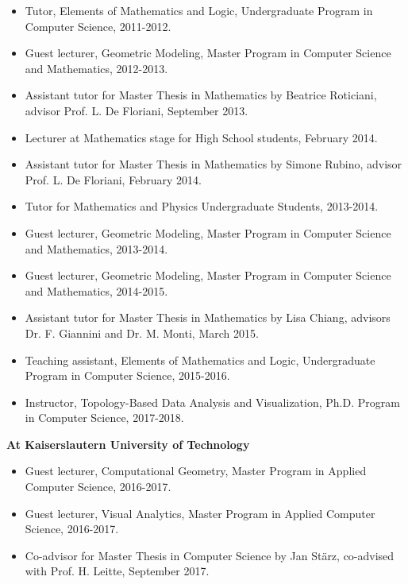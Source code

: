 \documentclass[11pt]{article}
\begin{document}
\begin{itemize}
\item Tutor, Elements of Mathematics and Logic, Undergraduate Program in Computer Science, 2011-2012.
\item Guest lecturer, Geometric Modeling, Master Program in Computer Science and Mathematics, 2012-2013.
\item Assistant tutor for Master Thesis in Mathematics by Beatrice Roticiani, advisor Prof. L. De Floriani, September 2013.
\item Lecturer at Mathematics stage for High School students, February 2014.
\item Assistant tutor for Master Thesis in Mathematics by Simone Rubino, advisor Prof. L. De Floriani, February 2014.
\item Tutor for Mathematics and Physics Undergraduate Students, 2013-2014.
\item Guest lecturer, Geometric Modeling, Master Program in Computer Science and Mathematics, 2013-2014.
\item Guest lecturer, Geometric Modeling, Master Program in Computer Science and Mathematics, 2014-2015.
\item Assistant tutor for Master Thesis in Mathematics by Lisa Chiang, advisors Dr. F. Giannini and Dr. M. Monti, March 2015.
\item Teaching assistant, Elements of Mathematics and Logic, Undergraduate Program in Computer Science, 2015-2016.
\item Instructor, Topology-Based Data Analysis and Visualization, Ph.D. Program in Computer Science, 2017-2018.
\end{itemize}

\vspace*{1ex}
\noindent
{\bf At Kaiserslautern University of Technology}

\begin{itemize}
  \item Guest lecturer, Computational Geometry, Master Program in Applied Computer Science, 2016-2017.
  \item Guest lecturer, Visual Analytics, Master Program in Applied Computer Science, 2016-2017.
  \item Co-advisor for Master Thesis in Computer Science by Jan St\"{a}rz, co-advised with Prof. H. Leitte, September 2017.
\end{itemize}
\end{document}
